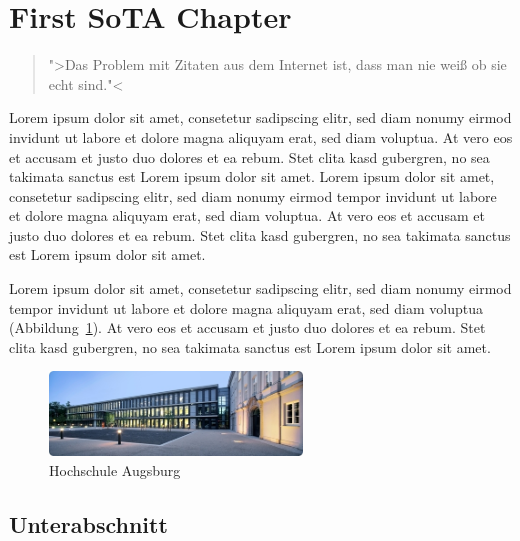 \section{First SoTA Chapter}
\label{sec:SoTA:first}

\begin{quote}
">Das Problem mit Zitaten aus dem Internet ist, dass man nie weiß ob sie echt sind."<
\citep{Einstein.2012}
\end{quote}

Lorem ipsum dolor sit amet, consetetur sadipscing elitr, sed diam nonumy eirmod  invidunt ut labore et dolore magna aliquyam erat, sed diam voluptua. At vero eos et accusam et justo duo dolores et ea rebum. Stet clita kasd gubergren, no sea takimata sanctus est Lorem ipsum dolor sit amet. Lorem ipsum dolor sit amet, consetetur sadipscing elitr, sed diam nonumy eirmod tempor invidunt ut labore et dolore magna aliquyam erat, sed diam voluptua. At vero eos et accusam et justo duo dolores et ea rebum. Stet clita kasd gubergren, no sea takimata sanctus est Lorem ipsum dolor sit amet.

Lorem ipsum dolor sit amet, consetetur sadipscing elitr, sed diam nonumy eirmod tempor invidunt ut labore et dolore magna aliquyam erat, sed diam voluptua (\vgl Abbildung~\ref{fig:hochschule}). At vero eos et accusam et justo duo dolores et ea rebum. Stet clita kasd gubergren, no sea takimata sanctus est Lorem ipsum dolor sit amet.

\begin{figure}
  \begin{center}
    \includegraphics[width=0.6\textwidth]{./images/hochschule.jpg}
  \end{center}
  \vspace{-5pt}
  \caption[Hochschule Augsburg]{Hochschule Augsburg \cite{HSA.2013}} %
  \label{fig:hochschule}
  \vspace{-5pt}
\end{figure}

\subsection{Unterabschnitt}
\label{subsec:SoTA:first:Unterabschnitt}

